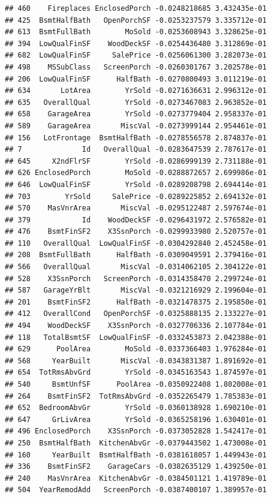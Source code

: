 \documentclass[american,]{article}
\theoremstyle{definition}
\theoremstyle{definition}
\theoremstyle{definition}
\theoremstyle{remark}
\begin{document}
\begin{verbatim}
## 460    Fireplaces EnclosedPorch -0.0248218685 3.432435e-01
## 425  BsmtHalfBath   OpenPorchSF -0.0253237579 3.335712e-01
## 613  BsmtFullBath        MoSold -0.0253608943 3.328625e-01
## 394  LowQualFinSF    WoodDeckSF -0.0254436480 3.312869e-01
## 682  LowQualFinSF     SalePrice -0.0256061300 3.282073e-01
## 498    MSSubClass   ScreenPorch -0.0260301767 3.202578e-01
## 206  LowQualFinSF      HalfBath -0.0270800493 3.011219e-01
## 634       LotArea        YrSold -0.0271636631 2.996312e-01
## 635   OverallQual        YrSold -0.0273467083 2.963852e-01
## 658    GarageArea        YrSold -0.0273779404 2.958337e-01
## 589    GarageArea       MiscVal -0.0273999144 2.954461e-01
## 156   LotFrontage  BsmtHalfBath -0.0278556578 2.874837e-01
## 7              Id   OverallQual -0.0283647539 2.787617e-01
## 645     X2ndFlrSF        YrSold -0.0286999139 2.731188e-01
## 626 EnclosedPorch        MoSold -0.0288872657 2.699986e-01
## 646  LowQualFinSF        YrSold -0.0289208798 2.694414e-01
## 703        YrSold     SalePrice -0.0289225852 2.694132e-01
## 570    MasVnrArea       MiscVal -0.0295122487 2.597674e-01
## 379            Id    WoodDeckSF -0.0296431972 2.576582e-01
## 476    BsmtFinSF2    X3SsnPorch -0.0299933980 2.520757e-01
## 110   OverallQual  LowQualFinSF -0.0304292840 2.452458e-01
## 208  BsmtFullBath      HalfBath -0.0309049591 2.379416e-01
## 566   OverallQual       MiscVal -0.0314062105 2.304122e-01
## 528    X3SsnPorch   ScreenPorch -0.0314358470 2.299724e-01
## 587   GarageYrBlt       MiscVal -0.0321216929 2.199604e-01
## 201    BsmtFinSF2      HalfBath -0.0321478375 2.195850e-01
## 412   OverallCond   OpenPorchSF -0.0325888135 2.133227e-01
## 494    WoodDeckSF    X3SsnPorch -0.0327706336 2.107784e-01
## 118   TotalBsmtSF  LowQualFinSF -0.0332453873 2.042388e-01
## 629      PoolArea        MoSold -0.0337366403 1.976284e-01
## 568     YearBuilt       MiscVal -0.0343831387 1.891692e-01
## 654  TotRmsAbvGrd        YrSold -0.0345163543 1.874597e-01
## 540     BsmtUnfSF      PoolArea -0.0350922408 1.802008e-01
## 264    BsmtFinSF2  TotRmsAbvGrd -0.0352265479 1.785383e-01
## 652  BedroomAbvGr        YrSold -0.0360138928 1.690210e-01
## 647     GrLivArea        YrSold -0.0365258196 1.630401e-01
## 496 EnclosedPorch    X3SsnPorch -0.0373052828 1.542417e-01
## 250  BsmtHalfBath  KitchenAbvGr -0.0379443502 1.473008e-01
## 160     YearBuilt  BsmtHalfBath -0.0381618057 1.449943e-01
## 336    BsmtFinSF2    GarageCars -0.0382635129 1.439250e-01
## 240    MasVnrArea  KitchenAbvGr -0.0384501121 1.419789e-01
## 504  YearRemodAdd   ScreenPorch -0.0387400107 1.389957e-01

\end{verbatim}
\end{document}

